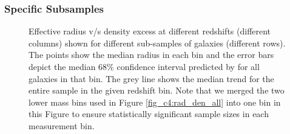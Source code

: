 \subsubsection{Specific Subsamples} \label{sec_c4:rad_den_sub}


\begin{figure}
    \begin{center}
  \end{center}
  \caption{Effective radius v/s density excess at different redshifts (different columns) shown for different sub-samples of galaxies (different rows). The points show the median radius in each bin and the error bars depict the median $68\%$ confidence interval predicted by \gampen{} for all galaxies in that bin. The grey line shows the median trend for the entire sample in the given redshift bin. Note that we merged the two lower mass bins used in Figure \ref{fig_c4:rad_den_all} into one bin in this Figure to ensure statistically significant sample sizes in each measurement bin.}
    \label{fig_c4:rad_den_sub}
\end{figure}

